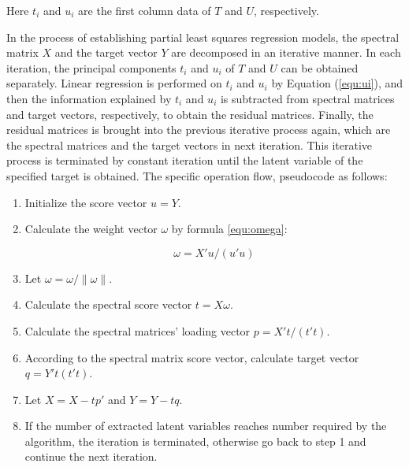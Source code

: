 \documentclass[a4paper,12pt,titlepage]{article} %
\numberwithin{equation}{section}  %
\begin{document}
	Here $t_i$ and $u_i$ are the first column data of $T$ and $U$, respectively.
	
	In the process of establishing partial least squares regression models, the spectral matrix $X$ and the target vector $Y$ are decomposed in an iterative manner. In each iteration, the principal components $t_i$ and $u_i$ of $T$ and $U$ can be obtained separately. Linear regression is performed on $t_i$ and $u_i$ by Equation (\ref{equ:ui}), and then the information explained by $t_i$ and $u_i$ is subtracted from spectral matrices and target vectors, respectively, to obtain the residual matrices. Finally, the residual matrices is brought into the previous iterative process again, which are the spectral matrices and the target vectors in next iteration. This iterative process is terminated by constant iteration until the latent variable of the specified target is obtained. The specific operation flow, pseudocode as follows:
	
	\begin{enumerate}
	
	\item Initialize the score vector $u=Y$.
	
	\item Calculate the weight vector $\omega$ by formula \ref{equ:omega}:
	
	\begin{equation}
	\omega=X'u/(u'u)
	\label{equ:omega} 
	\end{equation}
	
	\item Let $\omega=\omega/\left\|\omega\right\|$.
	
	\item Calculate the spectral score vector $t=X\omega$.
	
	\item Calculate the spectral matrices' loading vector $p=X't/(t't)$.
	
	\item According to the spectral matrix score vector, calculate target vector $q=Y't(t't)$.
	
	\item Let $X=X-tp'$ and $Y=Y-tq$.
	
	\item If the number of extracted latent variables reaches number required by the algorithm, the iteration is terminated, otherwise go back to step 1 and continue the next iteration.
	
	\end{enumerate}
	
\end{document}
